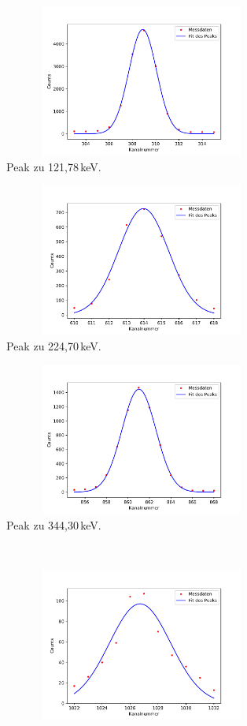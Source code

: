     \begin{figure}
      \centering
      \begin{subfigure}{0.31\textwidth}
        \centering
        \includegraphics[height=5cm, width=1\textwidth]{germania/peak1/peak1.pdf}
        \caption{Peak zu 121,78\,keV.}
      \end{subfigure}
      \begin{subfigure}{0.31\textwidth}
        \centering
        \includegraphics[height=5cm, width=1\textwidth]{germania/peak2/peak2.pdf}
        \caption{Peak zu 224,70\,keV.}
      \end{subfigure}
      \begin{subfigure}{0.31\textwidth}
        \centering
        \includegraphics[height=5cm, width=1\textwidth]{germania/peak3/peak3.pdf}
        \caption{Peak zu 344,30\,keV.}
      \end{subfigure}\\
      \begin{subfigure}{0.33\textwidth}
        \centering
        \includegraphics[height=5cm, width=1\textwidth]{germania/peak4/peak4.pdf}

\end{subfigure}
\end{figure}
